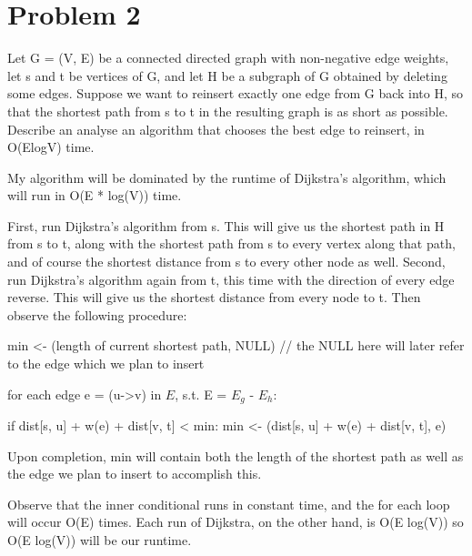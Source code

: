 \documentclass[]{report}
\begin{document}
\section*{Problem 2}
Let G = (V, E) be a connected directed graph with non-negative edge weights, let s and t be vertices of G, and let H be a subgraph of G obtained by deleting some edges. Suppose we want to reinsert exactly one edge from G back into H, so that the shortest path from s to t in the resulting graph is as short as possible. Describe an analyse an algorithm that chooses the best edge to reinsert, in O(ElogV) time.

My algorithm will be dominated by the runtime of Dijkstra's algorithm, which will run in O(E * log(V)) time.

First, run Dijkstra's algorithm from s. This will give us the shortest path in H from s to t, along with the shortest path from s to every vertex along that path, and of course the shortest distance from s to every other node as well.
Second, run Dijkstra's algorithm again from t, this time with the direction of every edge reverse. This will give us the shortest distance from every node to t.
Then observe the following procedure:

\bigskip
min <- (length of current shortest path, NULL) // the NULL here will later refer to the edge which we plan to insert

\bigskip
for each edge e = (u->v) in $E$, s.t. E = $E_g$ -  $E_h$:

	\setlength{\parindent}{30pt} if dist[s, u] + w(e) + dist[v, t] < min: min <- (dist[s, u] + w(e) + dist[v, t], e)
\setlength{\parindent}{15pt}

\bigskip
Upon completion, min will contain both the length of the shortest path as well as the edge we plan to insert to accomplish this.

Observe that the inner conditional runs in constant time, and the for each loop will occur O(E) times. Each run of Dijkstra, on the other hand, is O(E log(V)) so O(E log(V)) will be our runtime.
\end{document}
